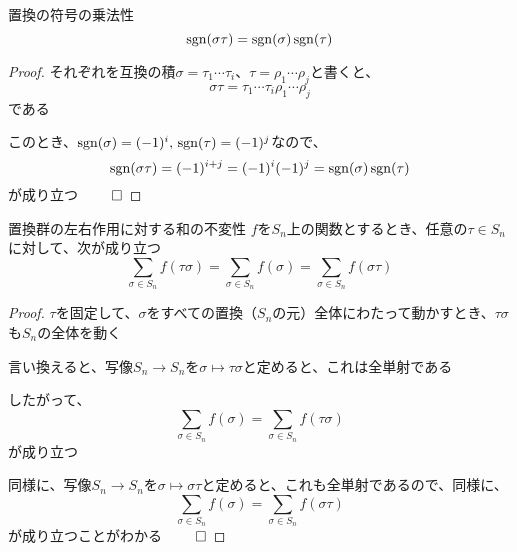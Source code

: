 \documentclass[../../../topic_linear-algebra]{subfiles}
\begin{document}
\sectionline

\begin{theorem}{置換の符号の乗法性}\label{thm:sign-multiplicativity}
  \begin{equation*}
    \operatorname{sgn}(\sigma \tau) = \operatorname{sgn}(\sigma) \operatorname{sgn}(\tau)
  \end{equation*}
\end{theorem}

\begin{proof}
  それぞれを互換の積$\sigma = \tau_1 \cdots \tau_i$、$\tau = \rho_1 \cdots \rho_j$と書くと、
  \begin{equation*}
    \sigma \tau = \tau_1 \cdots \tau_i \rho_1 \cdots \rho_j
  \end{equation*}
  である

  このとき、$\operatorname{sgn}(\sigma) = (-1)^i, \, \operatorname{sgn}(\tau) = (-1)^j$なので、
  \begin{equation*}
    \operatorname{sgn}(\sigma \tau) = (-1)^{i+j} = (-1)^i (-1)^j = \operatorname{sgn}(\sigma) \operatorname{sgn}(\tau)
  \end{equation*}
  が成り立つ $\qed$
\end{proof}

\sectionline

\begin{theorem}{置換群の左右作用に対する和の不変性}\label{thm:sum-invariance-under-permutation-action}
  $f$を$S_n$上の関数とするとき、任意の$\tau \in S_n$に対して、次が成り立つ
  \begin{equation*}
    \sum_{\sigma \in S_n} f(\tau\sigma) = \sum_{\sigma \in S_n} f(\sigma) = \sum_{\sigma \in S_n} f(\sigma\tau)
  \end{equation*}
\end{theorem}

\begin{proof}
  $\tau$を固定して、$\sigma$をすべての置換（$S_n$の元）全体にわたって動かすとき、$\tau\sigma$も$S_n$の全体を動く

  言い換えると、写像$S_n \to S_n$を$\sigma \longmapsto \tau\sigma$と定めると、これは全単射である

  したがって、
  \begin{equation*}
    \sum_{\sigma \in S_n} f(\sigma) = \sum_{\sigma \in S_n} f(\tau\sigma)
  \end{equation*}
  が成り立つ

  \br

  同様に、写像$S_n \to S_n$を$\sigma \longmapsto \sigma\tau$と定めると、これも全単射であるので、同様に、
  \begin{equation*}
    \sum_{\sigma \in S_n} f(\sigma) = \sum_{\sigma \in S_n} f(\sigma\tau)
  \end{equation*}
  が成り立つことがわかる $\qed$
\end{proof}
\end{document}
